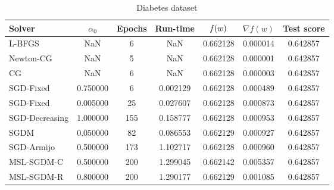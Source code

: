 \cleardoublepage
\begin{table}
\centering
\caption{Diabetes dataset}
\label{tab:diab-table}
\begin{tabular}{lS[round-precision=3]S[drop-zero-decimal]S[round-precision=4]S[round-precision=6]S[exponent-mode=scientific]S[round-precision=6]}
\toprule
Solver & {$\alpha_0$} & {Epochs} & {Run-time} & {$\operatorname*{\mathit{f}}(w)$} & {$\nabla f(w)$} & {Test score} \\
\midrule
L-BFGS & NaN & 6 & NaN & 0.662128 & 0.000014 & 0.642857 \\
Newton-CG & NaN & 5 & NaN & 0.662128 & 0.000001 & 0.642857 \\
CG & NaN & 6 & NaN & 0.662128 & 0.000003 & 0.642857 \\
SGD-Fixed & 0.750000 & 6 & 0.002129 & 0.662128 & 0.000489 & 0.642857 \\
SGD-Fixed & 0.005000 & 25 & 0.027607 & 0.662128 & 0.000873 & 0.642857 \\
SGD-Decreasing & 1.000000 & 155 & 0.158777 & 0.662128 & 0.000953 & 0.642857 \\
SGDM & 0.050000 & 82 & 0.086553 & 0.662129 & 0.000927 & 0.642857 \\
SGD-Armijo & 0.500000 & 173 & 1.102717 & 0.662128 & 0.000960 & 0.642857 \\
MSL-SGDM-C & 0.500000 & 200 & 1.299045 & 0.662142 & 0.005357 & 0.642857 \\
MSL-SGDM-R & 0.800000 & 200 & 1.290177 & 0.662129 & 0.001085 & 0.642857 \\
\bottomrule
\end{tabular}
\end{table}

